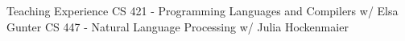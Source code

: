 \begin{rubric}{Teaching Experience}
\entry*[Fall 2025]
	CS 421 - Programming Languages and Compilers w/ Elsa Gunter
\entry*[Spring 2025]
	CS 447 - Natural Language Processing w/ Julia Hockenmaier
\end{rubric}
